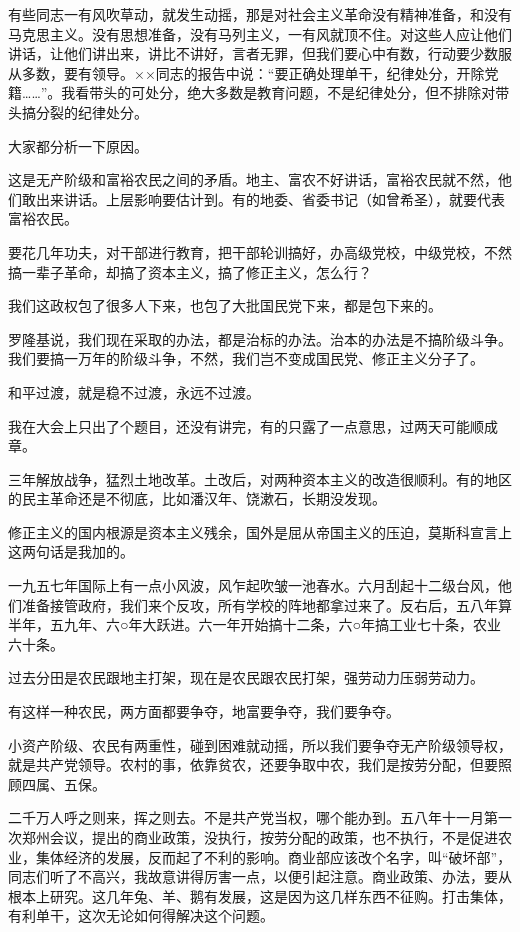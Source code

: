 有些同志一有风吹草动，就发生动摇，那是对社会主义革命没有精神准备，和没有马克思主义。没有思想准备，没有马列主义，一有风就顶不住。对这些人应让他们讲话，让他们讲出来，讲比不讲好，言者无罪，但我们要心中有数，行动要少数服从多数，要有领导。××同志的报告中说：“要正确处理单干，纪律处分，开除党籍……”。我看带头的可处分，绝大多数是教育问题，不是纪律处分，但不排除对带头搞分裂的纪律处分。

大家都分析一下原因。

这是无产阶级和富裕农民之间的矛盾。地主、富农不好讲话，富裕农民就不然，他们敢出来讲话。上层影响要估计到。有的地委、省委书记（如曾希圣），就要代表富裕农民。

要花几年功夫，对干部进行教育，把干部轮训搞好，办高级党校，中级党校，不然搞一辈子革命，却搞了资本主义，搞了修正主义，怎么行？

我们这政权包了很多人下来，也包了大批国民党下来，都是包下来的。

罗隆基说，我们现在采取的办法，都是治标的办法。治本的办法是不搞阶级斗争。我们要搞一万年的阶级斗争，不然，我们岂不变成国民党、修正主义分子了。

和平过渡，就是稳不过渡，永远不过渡。

我在大会上只出了个题目，还没有讲完，有的只露了一点意思，过两天可能顺成章。

三年解放战争，猛烈土地改革。土改后，对两种资本主义的改造很顺利。有的地区的民主革命还是不彻底，比如潘汉年、饶漱石，长期没发现。

修正主义的国内根源是资本主义残余，国外是屈从帝国主义的压迫，莫斯科宣言上这两句话是我加的。

一九五七年国际上有一点小风波，风乍起吹皱一池春水。六月刮起十二级台风，他们准备接管政府，我们来个反攻，所有学校的阵地都拿过来了。反右后，五八年算半年，五九年、六○年大跃进。六一年开始搞十二条，六○年搞工业七十条，农业六十条。

过去分田是农民跟地主打架，现在是农民跟农民打架，强劳动力压弱劳动力。

有这样一种农民，两方面都要争夺，地富要争夺，我们要争夺。

小资产阶级、农民有两重性，碰到困难就动摇，所以我们要争夺无产阶级领导权，就是共产党领导。农村的事，依靠贫农，还要争取中农，我们是按劳分配，但要照顾四属、五保。

二千万人呼之则来，挥之则去。不是共产党当权，哪个能办到。五八年十一月第一次郑州会议，提出的商业政策，没执行，按劳分配的政策，也不执行，不是促进农业，集体经济的发展，反而起了不利的影响。商业部应该改个名字，叫“破坏部”，同志们听了不高兴，我故意讲得厉害一点，以便引起注意。商业政策、办法，要从根本上研究。这几年兔、羊、鹅有发展，这是因为这几样东西不征购。打击集体，有利单干，这次无论如何得解决这个问题。

